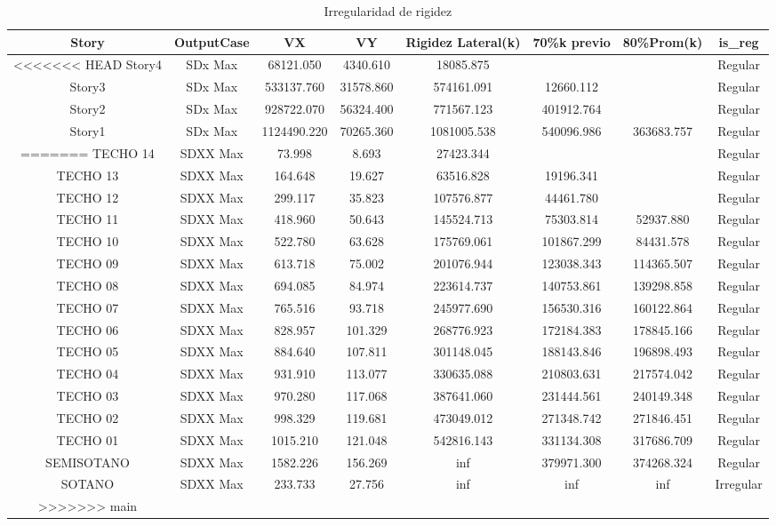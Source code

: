\documentclass{article}%
\begin{document}
\begin{table}[h!]%
\centering%
\caption{Irregularidad de rigidez}%
\begin{tabular}{cccccccc}
\toprule
Story & OutputCase & VX & VY & Rigidez Lateral(k) & 70\%k previo & 80\%Prom(k) & is\_reg \\
\midrule
<<<<<<< HEAD
Story4 & SDx Max & 68121.050 & 4340.610 & 18085.875 &  &  & Regular \\
Story3 & SDx Max & 533137.760 & 31578.860 & 574161.091 & 12660.112 &  & Regular \\
Story2 & SDx Max & 928722.070 & 56324.400 & 771567.123 & 401912.764 &  & Regular \\
Story1 & SDx Max & 1124490.220 & 70265.360 & 1081005.538 & 540096.986 & 363683.757 & Regular \\
=======
TECHO 14 & SDXX Max & 73.998 & 8.693 & 27423.344 &  &  & Regular \\
TECHO 13 & SDXX Max & 164.648 & 19.627 & 63516.828 & 19196.341 &  & Regular \\
TECHO 12 & SDXX Max & 299.117 & 35.823 & 107576.877 & 44461.780 &  & Regular \\
TECHO 11 & SDXX Max & 418.960 & 50.643 & 145524.713 & 75303.814 & 52937.880 & Regular \\
TECHO 10 & SDXX Max & 522.780 & 63.628 & 175769.061 & 101867.299 & 84431.578 & Regular \\
TECHO 09 & SDXX Max & 613.718 & 75.002 & 201076.944 & 123038.343 & 114365.507 & Regular \\
TECHO 08 & SDXX Max & 694.085 & 84.974 & 223614.737 & 140753.861 & 139298.858 & Regular \\
TECHO 07 & SDXX Max & 765.516 & 93.718 & 245977.690 & 156530.316 & 160122.864 & Regular \\
TECHO 06 & SDXX Max & 828.957 & 101.329 & 268776.923 & 172184.383 & 178845.166 & Regular \\
TECHO 05 & SDXX Max & 884.640 & 107.811 & 301148.045 & 188143.846 & 196898.493 & Regular \\
TECHO 04 & SDXX Max & 931.910 & 113.077 & 330635.088 & 210803.631 & 217574.042 & Regular \\
TECHO 03 & SDXX Max & 970.280 & 117.068 & 387641.060 & 231444.561 & 240149.348 & Regular \\
TECHO 02 & SDXX Max & 998.329 & 119.681 & 473049.012 & 271348.742 & 271846.451 & Regular \\
TECHO 01 & SDXX Max & 1015.210 & 121.048 & 542816.143 & 331134.308 & 317686.709 & Regular \\
SEMISOTANO & SDXX Max & 1582.226 & 156.269 & inf & 379971.300 & 374268.324 & Regular \\
SOTANO & SDXX Max & 233.733 & 27.756 & inf & inf & inf & Irregular \\
>>>>>>> main
\bottomrule
\end{tabular}
%
\end{table}
\end{document}
